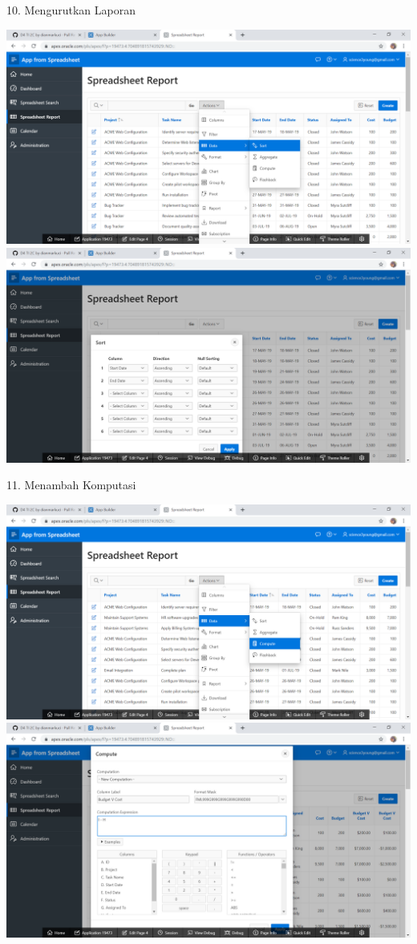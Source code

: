 \documentclass{article}
\begin{document}
\item 10. Mengurutkan Laporan
\begin{center}
  \includegraphics[width=10cm\textwidth]{figure/16.png}
  \includegraphics[width=10cm\textwidth]{figure/17.png}
  
\end{center}

\item 11. Menambah Komputasi
\begin{center}
    \includegraphics[width=10cm\textwidth]{figure/18.png}
    \includegraphics[width=10cm\textwidth]{figure/19.png}
    
\end{center}
\end{document}
